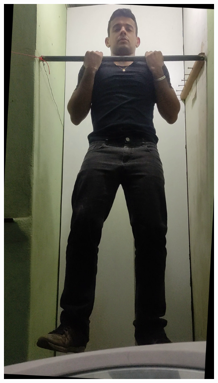 \renewcommand{\sizeImg}{0.2}
\begin{figure}[!htbp]
    \centering
        \begin{minipage}{\sizeImg\textwidth}
            \includegraphics[width=\textwidth]{figuras/ultrapassar_barra/134_original.png}
        \end{minipage}
        \begin{minipage}{\sizeImg\textwidth}

\end{minipage}
\end{figure}
